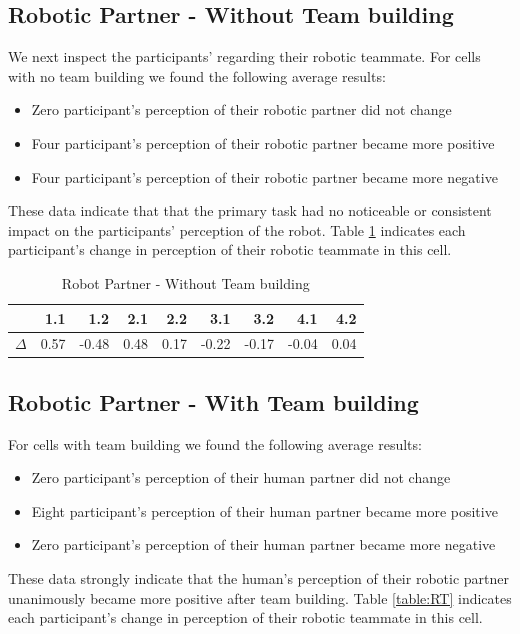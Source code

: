 \documentclass{acm_proc_article-sp}
\begin{document}
\subsection{Robotic Partner - Without Team building}
We next inspect the participants' regarding their  robotic teammate. For cells with no team building we found the following average results:
\begin{itemize}
 \item Zero participant's perception of their robotic partner did not change
 \item Four participant's perception of their robotic partner became more positive
 \item Four participant's perception of their robotic partner became more negative
\end{itemize}
These data indicate that that the primary task had no noticeable or consistent impact on the participants' perception of the robot. Table \ref{table:RNT} indicates each participant's change in perception of their robotic teammate in this cell.

\begin{table}
\centering
\caption{Robot Partner - Without Team building}
\begin{tabular}{|r|r|r|r|r|r|r|r|r|} \hline
&1.1&1.2&2.1&2.2&3.1&3.2&4.1&4.2\\ \hline
$\Delta$&0.57&-0.48&0.48&0.17&-0.22&-0.17&-0.04&0.04 \\ \hline
\end{tabular}
\label{table:RNT}
\end{table}

\subsection{Robotic Partner - With Team building}
For cells with team building we found the following average results:
\begin{itemize}
 \item Zero participant's perception of their human partner did not change
 \item Eight participant's perception of their human partner became more positive
 \item Zero participant's perception of their human partner became more negative
\end{itemize}
These data strongly indicate that the human's perception of their robotic partner unanimously became more positive after team building. Table \ref{table:RT} indicates each participant's change in perception of their robotic teammate in this cell.
\end{document}
